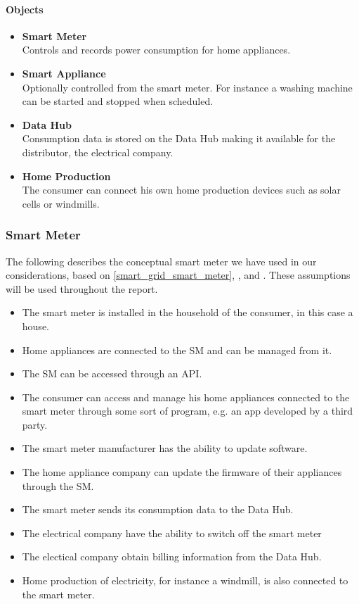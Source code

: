 \paragraph{Objects}
\begin{itemize}
\item \textbf{Smart Meter}\\ Controls and records power consumption for home appliances.
\item \textbf{Smart Appliance}\\ Optionally controlled from the smart meter.
For instance a washing machine can be started and stopped when scheduled.
\item \textbf{Data Hub}\\ Consumption data is stored on the Data Hub making it available for the distributor, the electrical company.
\item \textbf{Home Production}\\ The consumer can connect his own home production devices such as solar cells or windmills.
\end{itemize}

\subsubsection{Smart Meter}
The following describes the conceptual smart meter we have used in our considerations, based on \cref{smart_grid_smart_meter}, \citet{tdlm}, and \citet{smart_meter_survey}.
These assumptions will be used throughout the report.
\begin{itemize}
	\item The smart meter is installed in the household of the consumer, in this case a house.
	\item Home appliances are connected to the SM and can be managed from it.
	\item The SM can be accessed through an API.
	\item The consumer can access and manage his home appliances connected to the smart meter through some sort of program, e.g. an app developed by a third party.
	\item The smart meter manufacturer has the ability to update software. 
	\item The home appliance company can update the firmware of their appliances through the SM.
	\item The smart meter sends its consumption data to the Data Hub.
	\item The electrical company have the ability to switch off the smart meter 
	\item The electical company obtain billing information from the Data Hub.
	\item Home production of electricity, for instance a windmill, is also connected to the smart meter.
\end{itemize}

